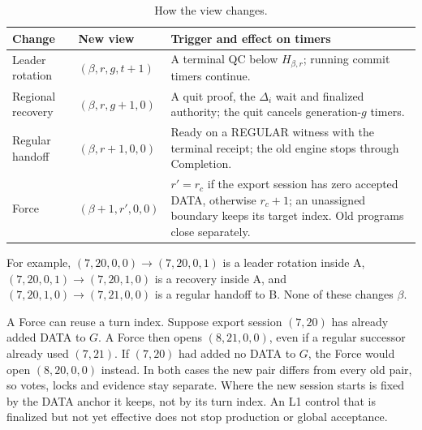 \documentclass[11pt,a4paper]{article}
\begin{document}
\begin{table}[htbp]\centering\small
\caption{How the view changes.}\label{tab:views}
\begin{tabularx}{\linewidth}{@{}>{\raggedright\arraybackslash}p{.19\linewidth}>{\raggedright\arraybackslash}p{.25\linewidth}Y@{}}\toprule
Change & New view & Trigger and effect on timers\\\midrule
Leader rotation & $(\beta,r,g,t+1)$ & A terminal QC below $H_{\beta,r}$;
running commit timers continue.\\
Regional recovery & $(\beta,r,g+1,0)$ & A quit proof, the $\Delta_i$ wait
and finalized authority; the quit cancels generation-$g$ timers.\\
Regular handoff & $(\beta,r+1,0,0)$ & Ready on a REGULAR witness
with the terminal receipt; the old engine stops through Completion.\\
Force & $(\beta+1,r',0,0)$ & $r'=r_c$ if the export session has zero
accepted DATA, otherwise $r_c+1$; an unassigned boundary keeps its
target index. Old programs close separately.\\
\bottomrule\end{tabularx}
\end{table}

For example, $(7,20,0,0)\to(7,20,0,1)$ is a leader rotation inside A,
$(7,20,0,1)\to(7,20,1,0)$ is a recovery inside A, and
$(7,20,1,0)\to(7,21,0,0)$ is a regular handoff to B. None of these
changes $\beta$.

A Force can reuse a turn index. Suppose export session $(7,20)$ has
already added DATA to $G$. A Force then opens $(8,21,0,0)$, even if
a regular successor already used $(7,21)$. If $(7,20)$ had added no
DATA to $G$, the Force would open $(8,20,0,0)$ instead. In both cases
the new pair differs from every old pair, so votes, locks and evidence
stay separate. Where the new session starts is fixed by the DATA anchor
it keeps, not by its turn index. An L1 control that is finalized but
not yet effective does not stop production or global acceptance.
\end{document}
